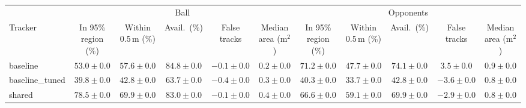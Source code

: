 \begin{tabular}{lcccccccccc}
\toprule
 & \multicolumn{5}{c}{Ball} & \multicolumn{5}{c}{Opponents} \\
\cmidrule(lr){2-6}\cmidrule(lr){7-11}
Tracker & In 95\% region (\%) & Within 0.5\,m (\%) & Avail.\ (\%) & False tracks & Median area (m$^2$) & In 95\% region (\%) & Within 0.5\,m (\%) & Avail.\ (\%) & False tracks & Median area (m$^2$) \\
\midrule
baseline & $53.0 \pm 0.0$ & $57.6 \pm 0.0$ & $84.8 \pm 0.0$ & $-0.1 \pm 0.0$ & $0.2 \pm 0.0$ & $71.2 \pm 0.0$ & $47.7 \pm 0.0$ & $74.1 \pm 0.0$ & $3.5 \pm 0.0$ & $0.9 \pm 0.0$ \\
baseline\_tuned & $39.8 \pm 0.0$ & $42.8 \pm 0.0$ & $63.7 \pm 0.0$ & $-0.4 \pm 0.0$ & $0.3 \pm 0.0$ & $40.3 \pm 0.0$ & $33.7 \pm 0.0$ & $42.8 \pm 0.0$ & $-3.6 \pm 0.0$ & $0.8 \pm 0.0$ \\
shared & $78.5 \pm 0.0$ & $69.9 \pm 0.0$ & $83.0 \pm 0.0$ & $-0.1 \pm 0.0$ & $0.4 \pm 0.0$ & $66.6 \pm 0.0$ & $59.1 \pm 0.0$ & $69.9 \pm 0.0$ & $-2.9 \pm 0.0$ & $0.8 \pm 0.0$ \\
\bottomrule
\end{tabular}
